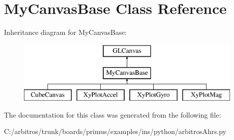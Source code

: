 \hypertarget{classarbitros_ahrs_1_1_my_canvas_base}{\section{My\-Canvas\-Base Class Reference}
\label{classarbitros_ahrs_1_1_my_canvas_base}
}
Inheritance diagram for My\-Canvas\-Base\-:\begin{figure}[H]
\begin{center}
\leavevmode
\includegraphics[height=3.000000cm]{classarbitros_ahrs_1_1_my_canvas_base}
\end{center}
\end{figure}


The documentation for this class was generated from the following file\-:\begin{DoxyCompactItemize}
\item 
C\-:/arbitros/trunk/boards/primus/examples/ins/python/arbitros\-Ahrs.\-py\end{DoxyCompactItemize}
